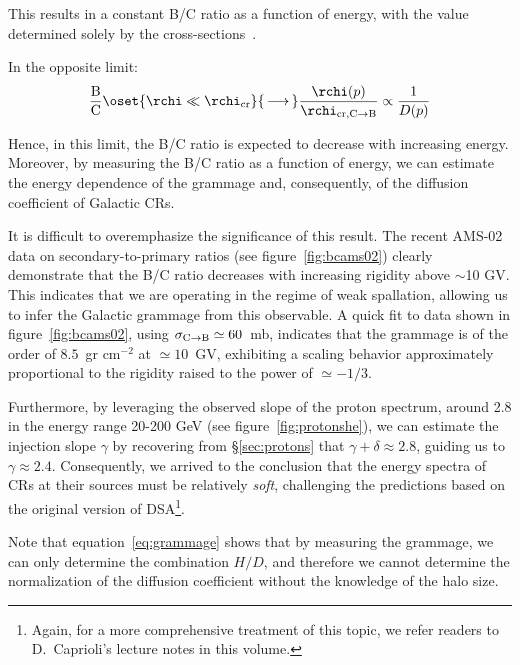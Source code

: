 This results in a constant B/C ratio as a function of energy, with the value determined solely by the cross-sections~\cite{Evoli2019prd}.

In the opposite limit:
%
\begin{equation}
\frac{\rm B}{\rm C} \oset{\rchi \ll \rchi_{\rm cr}}{\, \longrightarrow \,} \frac{\rchi(p)}{\rchi_{\rm cr, C\rightarrow B}} \propto \frac{1}{D(p)}
\label{eq:bchene}
\end{equation}

Hence, in this limit, the B/C ratio is expected to decrease with increasing energy. 
%
Moreover, by measuring the B/C ratio as a function of energy, we can estimate the energy dependence of the grammage and, consequently, of the diffusion coefficient of Galactic CRs.

It is difficult to overemphasize the significance of this result. 
%
The recent AMS-02 data on secondary-to-primary ratios (see figure~\ref{fig:bcams02}) clearly demonstrate that the B/C ratio decreases with increasing rigidity above $\sim$10 GV. %
%
This indicates that we are operating in the regime of weak spallation, allowing us to infer the Galactic grammage from this observable.
%
A quick fit to data shown in figure~\ref{fig:bcams02}, using $\sigma_{\rm C \rightarrow B} \simeq 60$~mb, indicates that the grammage is of the order of $8.5$~gr cm$^{-2}$ at $\simeq 10$~GV, exhibiting a scaling behavior approximately proportional to the rigidity raised to the power of $\simeq -1/3$. 

Furthermore, by leveraging the observed slope of the proton spectrum, around 2.8 in the energy range 20-200 GeV (see figure~\ref{fig:protonshe}), we can estimate the injection slope $\gamma$ by recovering from \S\ref{sec:protons} that $\gamma + \delta \approx 2.8$, guiding us to $\gamma \approx 2.4$. 
%
Consequently, we arrived to the conclusion that the energy spectra of CRs at their sources must be relatively \emph{soft}, challenging the predictions based on the original version of DSA\footnote{Again, for a more comprehensive treatment of this topic, we refer readers to D.~Caprioli's lecture notes in this volume.}.

Note that equation~\eqref{eq:grammage} shows that by measuring the grammage, we can only determine the combination $H/D$, and therefore we cannot determine the normalization of the diffusion coefficient without the knowledge of the halo size.

